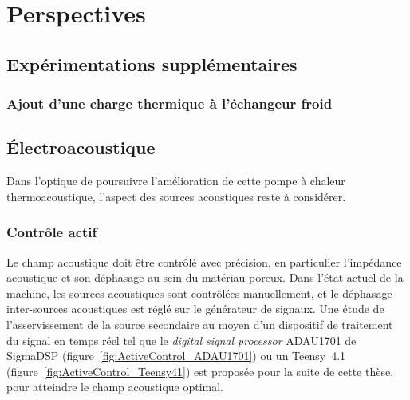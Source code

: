 \chapter{Perspectives}\label{chap:Persp}%
\mylocaltoc




\section{Expérimentations supplémentaires}

\subsection{Ajout d'une charge thermique à l'échangeur froid}


\section{\'Electroacoustique}

Dans l'optique de poursuivre l'amélioration de cette pompe à chaleur thermoacoustique, l'aspect des sources acoustiques reste à considérer.

\subsection{Contrôle actif}
Le champ acoustique doit être contrôlé avec précision, en particulier l'impédance acoustique et son déphasage au sein du matériau poreux. Dans l'état actuel de la machine, les sources acoustiques sont contrôlées manuellement, et le déphasage inter-sources acoustiques est réglé sur le générateur de signaux. Une étude de l'asservissement de la source secondaire au moyen d'un dispositif de traitement du signal en temps réel tel que le \textit{digital signal processor} ADAU1701 de SigmaDSP (figure~\ref{fig:ActiveControl_ADAU1701}) ou un Teensy~4.1 (figure~\ref{fig:ActiveControl_Teensy41}) est proposée pour la suite de cette thèse, pour atteindre le champ acoustique optimal.



